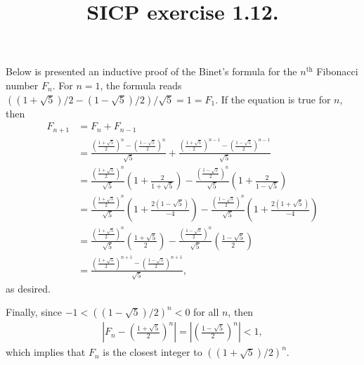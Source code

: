 \documentclass[12pt]{article}
\title{SICP exercise 1.12.}
\author{}
\date{}
\begin{document}
\maketitle
\vspace{-2cm}
Below is presented an inductive proof of the Binet's formula for the $n^{\text{th}}$ Fibonacci number $F_n$.
For $n=1$, the formula reads $((1+\sqrt{5})/2 - (1-\sqrt{5})/2) / \sqrt{5} = 1 = F_1$. If the
equation is true for $n$, then
\begin{align*}
  F_{n+1} &= F_n + F_{n-1} \\
          &= \frac{(\frac{1+\sqrt{5}}{2})^n - (\frac{1-\sqrt{5}}{2})^n}{\sqrt{5}} + \frac{(\frac{1+\sqrt{5}}{2})^{n-1} - (\frac{1-\sqrt{5}}{2})^{n-1}}{\sqrt{5}} \\
          &= \frac{(\frac{1+\sqrt{5}}{2})^n}{\sqrt{5}}\left(1 + \frac{2}{1+\sqrt{5}}\right) - \frac{(\frac{1-\sqrt{5}}{2})^n}{\sqrt{5}}\left(1 + \frac{2}{1-\sqrt{5}}\right) \\
          &= \frac{(\frac{1+\sqrt{5}}{2})^n}{\sqrt{5}}\left(1 + \frac{2(1 - \sqrt{5})}{-4}\right) - \frac{(\frac{1-\sqrt{5}}{2})^n}{\sqrt{5}}\left(1 + \frac{2(1+\sqrt{5})}{-4}\right) \\
          &= \frac{(\frac{1+\sqrt{5}}{2})^n}{\sqrt{5}}\left(\frac{1 + \sqrt{5}}{2}\right) - \frac{(\frac{1-\sqrt{5}}{2})^n}{\sqrt{5}}\left(\frac{1 - \sqrt{5}}{2}\right) \\
          &= \frac{(\frac{1+\sqrt{5}}{2})^{n+1} - (\frac{1-\sqrt{5}}{2})^{n+1}}{\sqrt{5}},
\end{align*}
as desired.

Finally, since $-1 < ((1-\sqrt{5})/2)^n < 0$ for all $n$, then
\begin{align*}
  \left|F_n - \left(\frac{1+\sqrt{5}}{2}\right)^n\right| = \left|\left(\frac{1-\sqrt{5}}{2}\right)^n\right| < 1,
\end{align*}
which implies that $F_n$ is the closest integer to $((1+\sqrt{5})/2)^n$.
\end{document}
